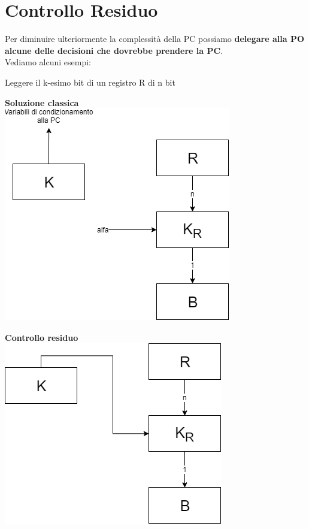 \documentclass[10pt]{report}
\begin{document}
\section{Controllo Residuo}
Per diminuire ulteriormente la complessità della PC possiamo \textbf{delegare alla PO alcune delle decisioni che dovrebbe prendere la PC}.\\
Vediamo alcuni esempi:
\begin{list}{}{}
	\item Leggere il k-esimo bit di un registro R di n bit
	\begin{multicols}{2}
	\begin{center}
	\textbf{Soluzione classica}\\
	\includegraphics[scale=0.5]{contrres_es1.png}
	\end{center}
	\columnbreak
	\begin{center}
	\textbf{Controllo residuo}\\
	\includegraphics[scale=0.5]{contrres_es1b.png}

\end{center}
\end{multicols}
\end{list}
\end{document}
